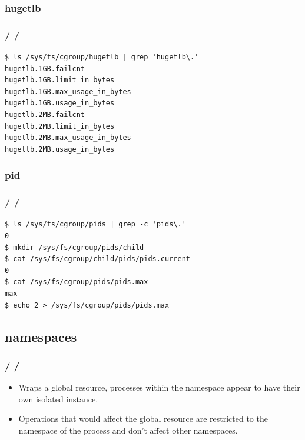 \documentclass{beamer}
\newcommand{\autotitle}
{\frametitle{
    \secname
    \ifx\insertsubsection\empty
    \else
        /\subsecname
        \ifx\insertsubsubsection\empty\else/\subsubsecname\fi
    \fi}}
\begin{document}
\subsubsection{hugetlb}

\begin{frame}[fragile]
    \autotitle
    \begin{verbatim}
$ ls /sys/fs/cgroup/hugetlb | grep 'hugetlb\.'
hugetlb.1GB.failcnt
hugetlb.1GB.limit_in_bytes
hugetlb.1GB.max_usage_in_bytes
hugetlb.1GB.usage_in_bytes
hugetlb.2MB.failcnt
hugetlb.2MB.limit_in_bytes
hugetlb.2MB.max_usage_in_bytes
hugetlb.2MB.usage_in_bytes
    \end{verbatim}
\end{frame}

\subsubsection{pid}

\begin{frame}[fragile]
    \autotitle
    \begin{verbatim}
$ ls /sys/fs/cgroup/pids | grep -c 'pids\.'
0
$ mkdir /sys/fs/cgroup/pids/child
$ cat /sys/fs/cgroup/child/pids/pids.current
0
$ cat /sys/fs/cgroup/pids/pids.max
max
$ echo 2 > /sys/fs/cgroup/pids/pids.max
    \end{verbatim}
\end{frame}

\subsection{namespaces}

\begin{frame}
    \autotitle
    \begin{itemize}
        \item
            Wraps a global resource, processes within the namespace appear to
            have their own isolated instance.
        \item
            Operations that would affect the global resource are restricted to
            the namespace of the process and don't affect other namespaces.
    \end{itemize}
\end{frame}
\end{document}
